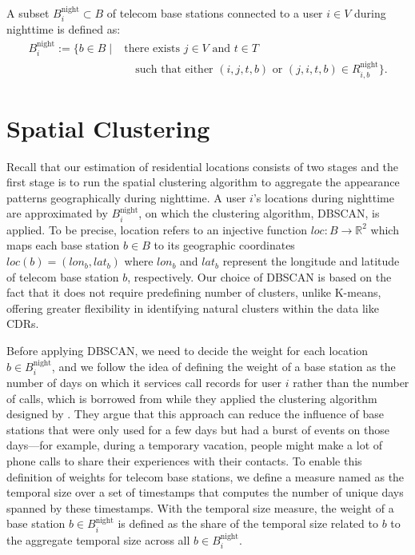 \pagebreak
\begin{definition}
A subset $B^{\text{night}}_i \subset B$ of telecom base stations connected to a user $i \in V$ during nighttime is defined as:
\begin{align*}
B^{\text{night}}_i := \{
    b \in B
    \mid
    &\text{there exists } j \in V \text{ and } t \in T \\
    &\quad \text{such that either } (i, j, t, b) \text{ or } (j, i, t, b) \in R^{\text{night}}_{i, b}
\}.
\end{align*}
\end{definition}

\section{Spatial Clustering}
Recall that our estimation of residential locations consists of two stages and the first stage is to run the spatial clustering algorithm to aggregate the appearance patterns geographically during nighttime. A user $i$'s locations during nighttime are approximated by $B^{\text{night}}_i$, on which the clustering algorithm, DBSCAN, is applied. To be precise, location refers to an injective function $loc: B \rightarrow \mathbb{R}^2$ which maps each base station $b \in B$ to its geographic coordinates $loc(b) = (lon_b, lat_b)$ where $lon_b$ and $lat_b$ represent the longitude and latitude of telecom base station $b$, respectively. Our choice of DBSCAN is based on the fact that it does not require predefining number of clusters, unlike K-means, offering greater flexibility in identifying natural clusters within the data like CDRs.

Before applying DBSCAN, we need to decide the weight for each location $b \in B^{\text{night}}_i$, and we follow the idea of defining the weight of a base station as the number of days on which it services call records for user $i$ rather than the number of calls, which is borrowed from \cite{isaacman2011identifying} while they applied the clustering algorithm designed by \cite{hartigan1975clustering}. They argue that this approach can reduce the influence of base stations that were only used for a few days but had a burst of events on those days—for example, during a temporary vacation, people might make a lot of phone calls to share their experiences with their contacts. To enable this definition of weights for telecom base stations, we define a measure named as the temporal size over a set of timestamps that computes the number of unique days spanned by these timestamps. With the temporal size measure, the weight of a base station $b \in B^{\text{night}}_i$ is defined as the share of the temporal size related to $b$ to the aggregate temporal size across all $b \in B^{\text{night}}_i$.

